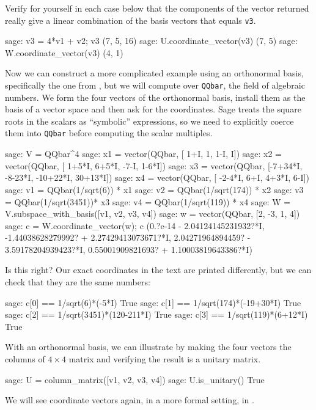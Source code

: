 Verify for yourself in each case below that the components of the vector returned really give a linear combination of the basis vectors that equals \verb?v3?.
%
\begin{sageexample}
sage: v3 = 4*v1 + v2; v3
(7, 5, 16)
sage: U.coordinate_vector(v3)
(7, 5)
sage: W.coordinate_vector(v3)
(4, 1)
\end{sageexample}
%
Now we can construct a more complicated example using an orthonormal basis, specifically the one from , but we will compute over \verb?QQbar?, the field of algebraic numbers.  We form the four vectors of the orthonormal basis, install them as the basis of a vector space and then ask for the coordinates.  Sage treats the square roots in the scalars as ``symbolic'' expressions, so we need to explicitly coerce them into \verb?QQbar? before computing the scalar multiples.
%
\begin{sageexample}
sage: V = QQbar^4
sage: x1 = vector(QQbar, [    1+I,       1,      1-I,       I])
sage: x2 = vector(QQbar, [  1+5*I,   6+5*I,     -7-I,   1-6*I])
sage: x3 = vector(QQbar, [-7+34*I, -8-23*I, -10+22*I, 30+13*I])
sage: x4 = vector(QQbar, [ -2-4*I,     6+I,    4+3*I,     6-I])
sage: v1 = QQbar(1/sqrt(6))   * x1
sage: v2 = QQbar(1/sqrt(174)) * x2
sage: v3 = QQbar(1/sqrt(3451))* x3
sage: v4 = QQbar(1/sqrt(119)) * x4
sage: W = V.subspace_with_basis([v1, v2, v3, v4])
sage: w = vector(QQbar, [2, -3, 1, 4])
sage: c = W.coordinate_vector(w); c
(0.?e-14           - 2.04124145231932?*I,
-1.44038628279992? + 2.27429413073671?*I,
 2.04271964894459? - 3.59178204939423?*I,
 0.55001909821693? + 1.10003819643386?*I)
\end{sageexample}
%
Is this right?  Our exact coordinates in the text are printed differently, but we can check that they are the same numbers:
%
\begin{sageexample}
sage: c[0] == 1/sqrt(6)*(-5*I)
True
sage: c[1] == 1/sqrt(174)*(-19+30*I)
True
sage: c[2] == 1/sqrt(3451)*(120-211*I)
True
sage: c[3] == 1/sqrt(119)*(6+12*I)
True
\end{sageexample}
%
With an orthonormal basis, we can illustrate  by making the four vectors the columns of $4\times 4$ matrix and verifying the result is a unitary matrix.
%
\begin{sageexample}
sage: U = column_matrix([v1, v2, v3, v4])
sage: U.is_unitary()
True
\end{sageexample}
%
We will see coordinate vectors again, in a more formal setting, in .
%
\begin{sageverbatim}
\end{sageverbatim}
%
